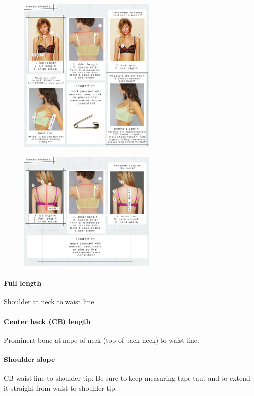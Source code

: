 \documentclass{article}
\begin{document}
\begin{figure}[!htp]
\centering
\subfigure
{
	\includegraphics[width=0.6\textwidth]{front-measurements.jpg}
}

\subfigure
{
	\includegraphics[width=0.6\textwidth]{back-measurements.jpg}
}
\end{figure}


\paragraph{Full length} Shoulder at neck to waist line.

\paragraph{Center back (CB) length} Prominent bone at nape of neck (top of back neck) to waist line.

\paragraph{Shoulder slope} CB waist line to shoulder tip. Be sure to keep measuring tape taut and to extend it straight from waist to shoulder tip.
\end{document}
